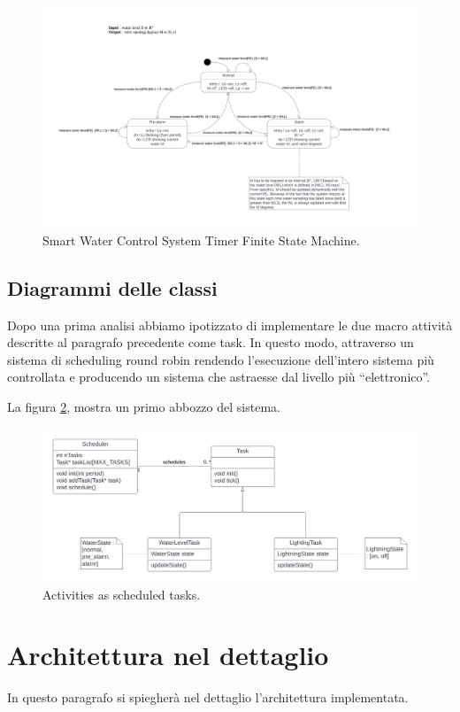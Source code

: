 \documentclass[a4paper,12pt]{report}
\begin{document}
\begin{figure}[H]
\centering
\includegraphics[width=\textwidth]{img/State - WaterLevel.png}
\caption{Smart Water Control System Timer Finite State Machine.}
\label{fig:FSMSmartWaterControl}
\end{figure}

\subsection{Diagrammi delle classi}
Dopo una prima analisi abbiamo ipotizzato di implementare le due macro attività descritte al paragrafo precedente come task. In questo modo, attraverso un sistema di scheduling round robin rendendo l'esecuzione dell'intero sistema più controllata e producendo un sistema che astraesse dal livello più ``elettronico''. 

La figura \ref{fig:classiTask}, mostra un primo abbozzo del sistema.

\begin{figure}[H]
\centering
\includegraphics[width=\textwidth]{img/Classi - WaterLevelScheduling.png}
\caption{Activities as scheduled tasks.}
\label{fig:classiTask}
\end{figure}

\section{Architettura nel dettaglio}
In questo paragrafo si spiegherà nel dettaglio l'architettura implementata.
\end{document}
